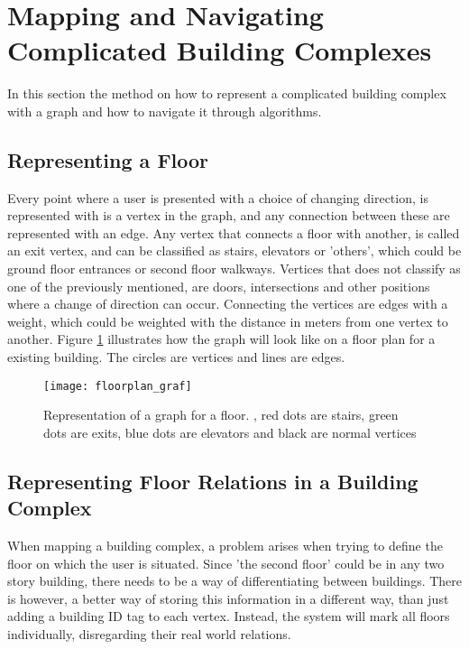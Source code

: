 
\section{Mapping and Navigating Complicated Building Complexes}

In this section the method on how to represent a complicated building complex with a graph and how to navigate it through algorithms.

\subsection{Representing a Floor}

Every point where a user is presented with a choice of changing direction, is represented with is a vertex in the graph, and any connection between these are represented with an edge. \label{e_vertex} Any vertex that connects a floor with another, is called an exit vertex, and can be classified as stairs, elevators or 'others', which could be ground floor entrances or second floor walkways. Vertices that does not classify as one of the previously mentioned, are doors, intersections and other positions where a change of direction can occur. Connecting the vertices are edges with a weight, which could be weighted with the distance in meters from one vertex to another. Figure \ref{fig:floorplan_graf} illustrates how the graph will look like on a floor plan for a existing building. The circles are vertices and lines are edges.

\begin{figure}[ht!]
    \centering
    \texttt{[image: floorplan\_graf]}
    \caption{Representation of a graph for a floor. \cite{billedafbygningudengraf}, red dots are stairs, green dots are exits, blue dots are elevators and black are normal vertices}
    \label{fig:floorplan_graf}
  \end{figure}

\subsection{Representing Floor Relations in a Building Complex}

When mapping a building complex, a problem arises when trying to define the floor on which the user is situated. Since 'the second floor' could be in any two story building, there needs to be a way of differentiating between buildings. There is however, a better way of storing this information in a different way, than just adding a building ID tag to each vertex. Instead, the system will mark all floors individually, disregarding their real world relations.

